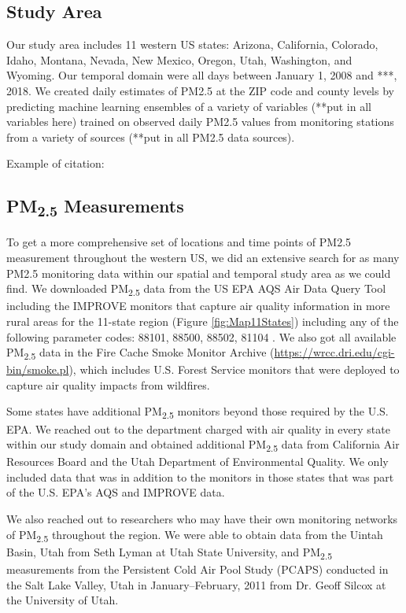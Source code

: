 \documentclass[english]{article}
\begin{document}
\subsection*{Study Area}

Our study area includes 11 western US states: Arizona, California, Colorado, Idaho, Montana, Nevada, New Mexico, Oregon, Utah, Washington, and Wyoming. Our temporal domain were all days between January 1, 2008 and ***, 2018. We created daily estimates of PM2.5 at the ZIP code and county levels by predicting machine learning ensembles of a variety of variables (**put in all variables here) trained on observed daily PM2.5 values from monitoring stations from a variety of sources (**put in all PM2.5 data sources). 

Example of citation: \cite{liu_estimating_2005}

\subsection*{PM\textsubscript{2.5} Measurements}
To get a more comprehensive set of locations and time points of PM2.5 measurement throughout the western US, we did an extensive search for as many PM2.5 monitoring data within our spatial and temporal study area as we could find. We downloaded PM\textsubscript{2.5} data from the US EPA AQS Air Data Query Tool \citep{EPAAirData2017} including the IMPROVE monitors that capture air quality information in 
more rural areas \citep{EPANPM25IMPROVE2017} for the 11-state region (Figure \ref{fig:Map11States}) including any of the following parameter codes: 88101, 88500, 88502, 81104 \citep{EPANPM25Memo2017,EPANPM25Parameters2017,EPANAllParameters2017}. We also got all available PM\textsubscript{2.5} data in the Fire Cache Smoke Monitor Archive (\url{https://wrcc.dri.edu/cgi-bin/smoke.pl}), which includes U.S. Forest Service monitors that were deployed to capture air quality impacts from wildfires. 

Some states have additional PM\textsubscript{2.5} monitors beyond those required by the U.S. EPA. We reached out to the department charged with air quality in every state within our study domain and obtained additional PM\textsubscript{2.5} data from California Air Resources Board and the Utah Department of Environmental Quality. We only included data that was in addition to the monitors in those states that was part of the U.S. EPA's AQS and IMPROVE data.   

We also reached out to researchers who may have their own monitoring networks of PM\textsubscript{2.5} throughout the region. We were able to obtain data from the Uintah Basin, Utah from Seth Lyman at Utah State University, and PM\textsubscript{2.5} measurements from the Persistent Cold Air Pool Study (PCAPS) \cite{Silcox_wintertime_2012} conducted in the Salt Lake Valley, Utah in January--February, 2011 from Dr. Geoff Silcox at the University of Utah.  
\end{document}
